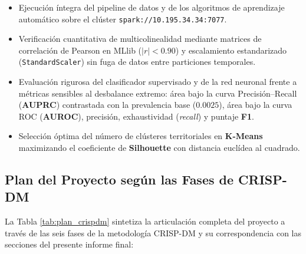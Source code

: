 \begin{itemize}
    \item Ejecución íntegra del pipeline de datos y de los algoritmos de aprendizaje automático sobre el clúster \texttt{spark://10.195.34.34:7077}.
    \item Verificación cuantitativa de multicolinealidad mediante matrices de correlación de Pearson en MLlib ($|r| < 0.90$) y escalamiento estandarizado (\texttt{StandardScaler}) sin fuga de datos entre particiones temporales.
    \item Evaluación rigurosa del clasificador supervisado y de la red neuronal frente a métricas sensibles al desbalance extremo: área bajo la curva Precisión--Recall (\textbf{AUPRC}) contrastada con la prevalencia base ($0.0025$), área bajo la curva ROC (\textbf{AUROC}), precisión, exhaustividad (\textit{recall}) y puntaje \textbf{F1}.
    \item Selección óptima del número de clústeres territoriales en \textbf{K-Means} maximizando el coeficiente de \textbf{Silhouette} con distancia euclídea al cuadrado.
\end{itemize}

\subsection{Plan del Proyecto según las Fases de CRISP-DM}

La Tabla \ref{tab:plan_crispdm} sintetiza la articulación completa del proyecto a través de las seis fases de la metodología CRISP-DM y su correspondencia con las secciones del presente informe final:

